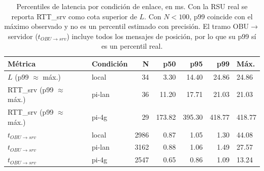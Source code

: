 \begin{table}[H]
\centering
\caption{Percentiles de latencia por condición de enlace, en ms. Con la RSU real se reporta RTT\_srv como cota superior de $L$. Con $N < 100$, p99 coincide con el máximo observado y no es un percentil estimado con precisión. El tramo OBU$\to$servidor ($t_{OBU\to srv}$) incluye todos los mensajes de posición, por lo que su p99 sí es un percentil real.}
\label{tab:latencia_percentiles}
\small
\begin{tabular}{llrrrrl}
\toprule
\textbf{Métrica} & \textbf{Condición} & \textbf{N} & \textbf{p50} & \textbf{p95} & \textbf{p99} & \textbf{Máx.} \\
\midrule
$L$ (p99 $\approx$ máx.) & local & 34 & 3.30 & 14.40 & 24.86 & 24.86 \\
RTT\_srv (p99 $\approx$ máx.) & pi-lan & 36 & 11.20 & 17.71 & 21.03 & 21.03 \\
RTT\_srv (p99 $\approx$ máx.) & pi-4g & 29 & 173.82 & 395.30 & 418.77 & 418.77 \\
$t_{OBU\to srv}$ & local & 2986 & 0.87 & 1.05 & 1.30 & 44.08 \\
$t_{OBU\to srv}$ & pi-lan & 3162 & 0.88 & 1.06 & 1.49 & 27.57 \\
$t_{OBU\to srv}$ & pi-4g & 2547 & 0.65 & 0.86 & 1.09 & 13.24 \\
\bottomrule
\end{tabular}
\end{table}

